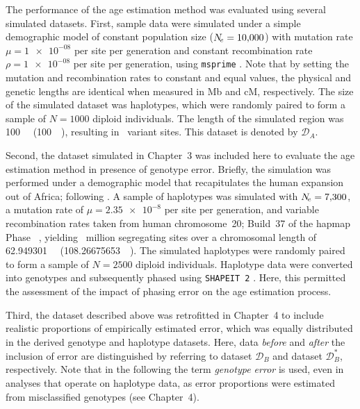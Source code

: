 The performance of the age estimation method was evaluated using several simulated datasets.
First, sample data were simulated under a simple demographic model of constant population size (${N_{\!e} = \num{10000}}$) with mutation rate ${\mu = \num{1e-08}}$ per site per generation and constant recombination rate ${\rho = \num{1e-08}}$ per site per generation, using \texttt{msprime} \citep{Kelleher:2016fn}.
Note that by setting the mutation and recombination rates to constant and equal values, the physical and genetic lengths are identical when measured in \gls{Mb} and \gls{cM}, respectively.
The size of the simulated dataset was  haplotypes, which were randomly paired to form a sample of ${N = \num{1000}}$ diploid individuals.
The length of the simulated region was \SI{100}{\mega\basepair} (\SI{100}{\centi\morgan}), resulting in ~variant sites.
This dataset is denoted by $\mathcal{D}_A$.

Second, the dataset simulated in Chapter~3 was included here to evaluate the age estimation method in presence of genotype error.
Briefly, the simulation was performed under a demographic model that recapitulates the human expansion out of Africa; following \citet{Gutenkunst:2009gs}.
A sample of  haplotypes was simulated with ${N_{\!e} = \num{7300}}$, a mutation rate of ${\mu = \num[round-precision=2]{2.35e-8}}$ per site per generation, and variable recombination rates taken from human chromosome~20; Build~37 of the \gls{hapmap} Phase~ \citep{Frazer:2007kha, InternationalHapMapConsortium:2010en}, yielding ~million segregating sites over a chromosomal length of \SI{62.949301}{\mega\basepair} (\SI{108.26675653}{\centi\morgan}).
The simulated haplotypes were randomly paired to form a sample of ${N = \num{2500}}$ diploid individuals.
Haplotype data were converted into genotypes and subsequently phased using \texttt{SHAPEIT\,2} \citep{Delaneau:2008dk,Delaneau:2013hi}.
Here, this permitted the assessment of the impact of phasing error on the age estimation process.

Third, the dataset described above was retrofitted in Chapter~4 to include realistic proportions of empirically estimated error, which was equally distributed in the derived genotype and haplotype datasets.
Here, data \emph{before} and \emph{after} the inclusion of error are distinguished by referring to dataset $\mathcal{D}_B$ and dataset $\mathcal{D}_B^{\ast}$, respectively.
Note that in the following the term \emph{genotype error} is used, even in analyses that operate on haplotype data, as error proportions were estimated from misclassified genotypes (see Chapter~4).

